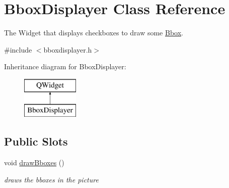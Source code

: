 \hypertarget{class_bbox_displayer}{}\section{Bbox\+Displayer Class Reference}
\label{class_bbox_displayer}


The Widget that displays checkboxes to draw some \hyperlink{class_bbox}{Bbox}.  




{\ttfamily \#include $<$bboxdisplayer.\+h$>$}

Inheritance diagram for Bbox\+Displayer\+:\begin{figure}[H]
\begin{center}
\leavevmode
\includegraphics[height=2.000000cm]{class_bbox_displayer}
\end{center}
\end{figure}
\subsection*{Public Slots}
\begin{DoxyCompactItemize}
\item 
void \hyperlink{class_bbox_displayer_a7673afcbb9b907974a1e9880e996fd98}{draw\+Bboxes} ()\hypertarget{class_bbox_displayer_a7673afcbb9b907974a1e9880e996fd98}{}\label{class_bbox_displayer_a7673afcbb9b907974a1e9880e996fd98}

\begin{DoxyCompactList}\small\item\em draws the bboxes in the picture \end{DoxyCompactList}\end{DoxyCompactItemize}

